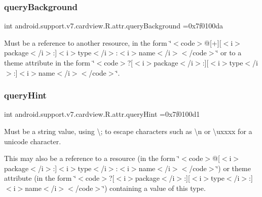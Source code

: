 \subsubsection{\texorpdfstring{query\+Background}{queryBackground}}
{\footnotesize\ttfamily int android.\+support.\+v7.\+cardview.\+R.\+attr.\+query\+Background =0x7f0100da\hspace{0.3cm}{\ttfamily [static]}}

Must be a reference to another resource, in the form \char`\"{}$<$code$>$@\mbox{[}+\mbox{]}\mbox{[}$<$i$>$package$<$/i$>$\+:\mbox{]}$<$i$>$type$<$/i$>$\+:$<$i$>$name$<$/i$>$$<$/code$>$\char`\"{} or to a theme attribute in the form \char`\"{}$<$code$>$?\mbox{[}$<$i$>$package$<$/i$>$\+:\mbox{]}\mbox{[}$<$i$>$type$<$/i$>$\+:\mbox{]}$<$i$>$name$<$/i$>$$<$/code$>$\char`\"{}. \mbox{\label{classandroid_1_1support_1_1v7_1_1cardview_1_1R_1_1attr_afe946970f8f7924556844fe1b4970eab}} 
\subsubsection{\texorpdfstring{query\+Hint}{queryHint}}
{\footnotesize\ttfamily int android.\+support.\+v7.\+cardview.\+R.\+attr.\+query\+Hint =0x7f0100d1\hspace{0.3cm}{\ttfamily [static]}}

Must be a string value, using \textquotesingle{}\textbackslash{};\textquotesingle{} to escape characters such as \textquotesingle{}\textbackslash{}n\textquotesingle{} or \textquotesingle{}\textbackslash{}uxxxx\textquotesingle{} for a unicode character. 

This may also be a reference to a resource (in the form \char`\"{}$<$code$>$@\mbox{[}$<$i$>$package$<$/i$>$\+:\mbox{]}$<$i$>$type$<$/i$>$\+:$<$i$>$name$<$/i$>$$<$/code$>$\char`\"{}) or theme attribute (in the form \char`\"{}$<$code$>$?\mbox{[}$<$i$>$package$<$/i$>$\+:\mbox{]}\mbox{[}$<$i$>$type$<$/i$>$\+:\mbox{]}$<$i$>$name$<$/i$>$$<$/code$>$\char`\"{}) containing a value of this type. \mbox{\label{classandroid_1_1support_1_1v7_1_1cardview_1_1R_1_1attr_a0facf965724c5a1991b6e8a0e6de92bb}} 
